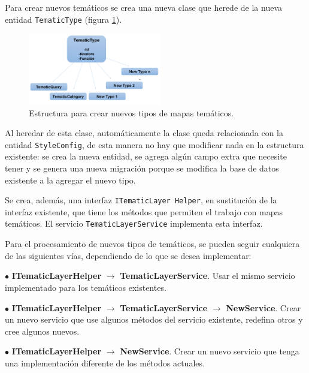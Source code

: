 Para crear nuevos tem\'aticos se crea una nueva clase que herede de la nueva entidad \texttt{TematicType} (figura \ref{nuevosTipos}). 

\begin{figure}
\vspace{-20pt}
\begin{center}
\includegraphics[width=0.52\textwidth]{images/newTematicTypes.png} 
\end{center} \vspace{-20pt} \caption{Estructura para crear nuevos tipos de mapas tem\'aticos.}  \label{nuevosTipos} \vspace{-10pt} 
\end{figure}

Al heredar de esta clase, autom\'aticamente la clase queda relacionada con la entidad \texttt{StyleConfig}, de esta manera no hay que modificar nada en la estructura existente: se crea la nueva entidad, se agrega alg\'un campo extra que necesite tener y se genera una nueva migraci\'on porque se modifica la base de datos existente a la agregar el nuevo tipo.

Se crea, adem\'as, una interfaz \texttt{ITematicLayer Helper}, en sustituci\'on de la interfaz existente, que tiene los m\'etodos que permiten el trabajo con mapas tem\'aticos. El servicio \texttt{TematicLayerService} implementa esta interfaz. 

Para el procesamiento de nuevos tipos de tem\'aticos, se pueden seguir cualquiera de las siguientes v\'ias, dependiendo de lo que se desea implementar:

$\bullet$ \textbf{ITematicLayerHelper} $\rightarrow$ \textbf{TematicLayerService}. Usar el mismo servicio implementado para los tem\'aticos existentes.

$\bullet$ \textbf{ITematicLayerHelper} $\rightarrow$ \textbf{TematicLayerService} $\rightarrow$ \textbf{NewService}. Crear un nuevo servicio que use algunos m\'etodos del servicio existente, redefina otros y cree algunos nuevos.

$\bullet$ \textbf{ITematicLayerHelper} $\rightarrow$ \textbf{NewService}. Crear un nuevo servicio que tenga una implementaci\'on diferente de los m\'etodos actuales.

